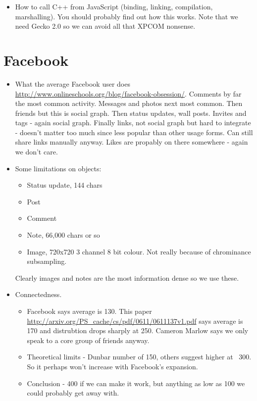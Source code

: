 \begin{itemize}
	\item How to call C++ from JavaScript (binding, linking, compilation, marshalling). You should probably find out how this works. Note that we need Gecko 2.0 so we can avoid all that XPCOM nonsense.
                
    \end{itemize}
    
\section{Facebook}

\begin{itemize}
   
    \item What the average Facebook user does \url{http://www.onlineschools.org/blog/facebook-obsession/}. Comments by far the most common activity. Messages and photos next most common. Then friends  but this is social graph. Then status updates, wall posts. Invites and tags - again social graph. Finally links, not social graph but hard to integrate - doesn't matter too much since less popular than other usage forms. Can still share links manually anyway. Likes are propably on there somewhere - again we don't care.
    
    \item Some limitations on objects: 
    \begin{itemize}
        \item Status update, 144 chars
        \item Post
        \item Comment
        \item Note, 66,000 chars or so
        \item Image, 720x720 3 channel 8 bit colour. Not really because of chrominance subsampling.
    \end{itemize}
    Clearly images and notes are the most information dense so we use these.
    
    \item Connectedness.
    \begin{itemize}
        \item Facebook says average is 130. This paper \url{http://arxiv.org/PS_cache/cs/pdf/0611/0611137v1.pdf} says average is 170 and distrubtion drops sharply at 250. Cameron Marlow says we only speak to a core group of friends anyway.
        \item Theoretical limits - Dunbar number of 150, others suggest higher at ~300. So it perhaps won't increase with Facebook's expansion.
        \item Conclusion - 400 if we can make it work, but anything as low as 100 we could probably get away with.
    \end{itemize}
    

\end{itemize}
